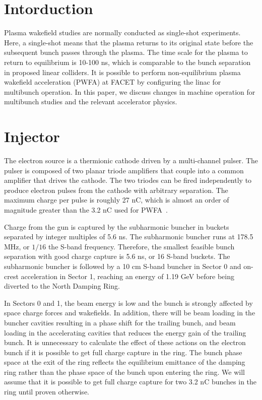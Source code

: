\documentclass[aps,prl,preprint,groupedaddress]{revtex4-1}
\begin{document}
\section{Intorduction}
Plasma wakefield studies are normally conducted as single-shot experiments. Here, a single-shot means that the plasma returns to its original state before the subsequent bunch passes through the plasma. The time scale for the plasma to return to equilibrium is 10-100 ns, which is comparable to the bunch separation in proposed linear colliders. It is possible to perform non-equilibrium plasma wakefield acceleration (PWFA) at FACET by configuring the linac for multibunch operation. In this paper, we discuss changes in machine operation for multibunch studies and the relevant accelerator physics.
\section{Injector}
The electron source is a thermionic cathode driven by a multi-channel pulser. The pulser is composed of two planar triode amplifiers that couple into a common amplifier that drives the cathode. The two triodes can be fired independently to produce electron pulses from the cathode with arbitrary separation. The maximum charge per pulse is roughly 27 nC, which is almost an order of magnitude greater than the 3.2 nC used for PWFA~\cite{gun}.

Charge from the gun is captured by the subharmonic buncher in buckets separated by integer multiples of 5.6 ns. The subharmonic buncher runs at 178.5 MHz, or $1/16$ the S-band frequency. Therefore, the smallest feasible bunch separation with good charge capture is 5.6 ns, or 16 S-band buckets. The subharmonic buncher is followed by a 10 cm S-band buncher in Sector 0 and on-crest acceleration in Sector 1, reaching an energy of 1.19 GeV before being diverted to the North Damping Ring. 

In Sectors 0 and 1, the beam energy is low and the bunch is strongly affected by space charge forces and wakefields. In addition, there will be beam loading in the buncher cavities resulting in a phase shift for the trailing bunch, and beam loading in the accelerating cavities that reduces the energy gain of the trailing bunch. It is unnecessary to calculate the effect of these actions on the electron bunch if it is possible to get full charge capture in the ring. The bunch phase space at the exit of the ring reflects the equilibrium emittance of the damping ring rather than the phase space of the bunch upon entering the ring. We will assume that it is possible to get full charge capture for two 3.2 nC bunches in the ring until proven otherwise.
\end{document}
